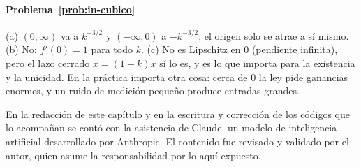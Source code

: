 \paragraph{Problema~\ref{prob:in-cubico}}
(a) $(0,\infty)$ va a $k^{-3/2}$ y $(-\infty,0)$ a $-k^{-3/2}$; el origen solo se atrae a sí mismo. (b) No: $f'(0)=1$ para todo $k$. (c) No es Lipschitz en $0$ (pendiente infinita), pero el lazo cerrado $\dot x=(1-k)x$ sí lo es, y es lo que importa para la existencia y la unicidad. En la práctica importa otra cosa: cerca de $0$ la ley pide ganancias enormes, y un ruido de medición pequeño produce entradas grandes.

\respuestaspausas

\begin{parallevar}
En la redacción de este capítulo y en la escritura y corrección de los códigos que lo acompañan se contó con la asistencia de Claude, un modelo de inteligencia artificial desarrollado por Anthropic. El contenido fue revisado y validado por el autor, quien asume la responsabilidad por lo aquí expuesto.
\end{parallevar}
